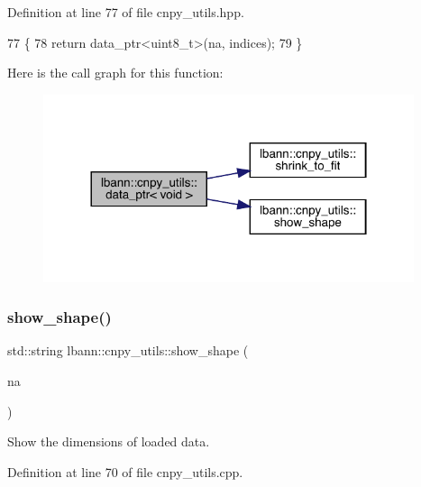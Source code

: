 Definition at line 77 of file cnpy\+\_\+utils.\+hpp.


\begin{DoxyCode}
77                                                                                      \{
78   \textcolor{keywordflow}{return} data\_ptr<uint8\_t>(na, indices);
79 \}
\end{DoxyCode}
Here is the call graph for this function\+:\nopagebreak
\begin{figure}[H]
\begin{center}
\leavevmode
\includegraphics[width=308pt]{namespacelbann_1_1cnpy__utils_aba43b785d14caa5c5df74674f10f0dd8_cgraph}
\end{center}
\end{figure}
\mbox{\label{namespacelbann_1_1cnpy__utils_a120e5719167d6d20b2a98c4282fd7a50}} 
\subsubsection{\texorpdfstring{show\+\_\+shape()}{show\_shape()}}
{\footnotesize\ttfamily std\+::string lbann\+::cnpy\+\_\+utils\+::show\+\_\+shape (\begin{DoxyParamCaption}\item[{const cnpy\+::\+Npy\+Array \&}]{na }\end{DoxyParamCaption})}



Show the dimensions of loaded data. 



Definition at line 70 of file cnpy\+\_\+utils.\+cpp.


